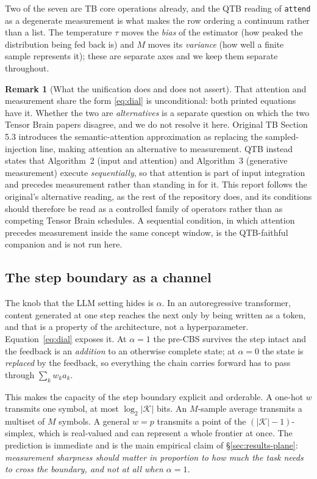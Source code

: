 \documentclass[11pt]{article}
\theoremstyle{definition}
\newtheorem{remark}{Remark}
\begin{document}
Two of the seven are TB core operations already, and the QTB reading of
\texttt{attend} as a degenerate measurement is what makes the row ordering a
continuum rather than a list. The temperature $\tau$ moves the \emph{bias} of the
estimator (how peaked the distribution being fed back is) and $M$ moves its
\emph{variance} (how well a finite sample represents it); these are separate axes
and we keep them separate throughout.

\begin{remark}[What the unification does and does not assert]
\label{rem:schedule}
That attention and measurement share the form \eqref{eq:dial} is unconditional:
both printed equations have it. Whether the two are \emph{alternatives} is a
separate question on which the two Tensor Brain papers disagree, and we do not
resolve it here. Original TB Section 5.3 introduces the semantic-attention
approximation as replacing the sampled-injection line, making attention an
alternative to measurement. QTB instead states that Algorithm~2 (input and
attention) and Algorithm~3 (generative measurement) execute \emph{sequentially},
so that attention is part of input integration and precedes measurement rather than
standing in for it. This report follows the original's alternative reading, as the
rest of the repository does, and its conditions should therefore be read as a
controlled family of operators rather than as competing Tensor Brain schedules. A
sequential condition, in which attention precedes measurement inside the same
concept window, is the QTB-faithful companion and is not run here.
\end{remark}

\subsection{The step boundary as a channel}
\label{sec:bottleneck}

The knob that the LLM setting hides is $\alpha$. In an autoregressive transformer,
content generated at one step reaches the next only by being written as a token, and
that is a property of the architecture, not a hyperparameter. Equation~\eqref{eq:dial}
exposes it. At $\alpha = 1$ the pre-CBS survives the step intact and the feedback is
an \emph{addition} to an otherwise complete state; at $\alpha = 0$ the state is
\emph{replaced} by the feedback, so everything the chain carries forward has to pass
through $\sum_k w_k a_k$.

This makes the capacity of the step boundary explicit and orderable. A one-hot $w$
transmits one symbol, at most $\log_2|\mathcal{K}|$ bits. An $M$-sample average
transmits a multiset of $M$ symbols. A general $w = p$ transmits a point of the
$(|\mathcal{K}|-1)$-simplex, which is real-valued and can represent a whole frontier
at once. The prediction is immediate and is the main empirical claim of
\S\ref{sec:results-plane}: \emph{measurement sharpness should matter in proportion to
how much the task needs to cross the boundary, and not at all when $\alpha = 1$.}
\end{document}
